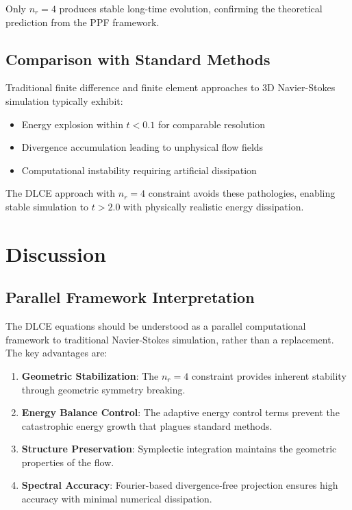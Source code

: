 \documentclass[conference]{IEEEtran}
\begin{document}
Only $n_r = 4$ produces stable long-time evolution, confirming the theoretical prediction from the PPF framework.

\subsection{Comparison with Standard Methods}

Traditional finite difference and finite element approaches to 3D Navier-Stokes simulation typically exhibit:
\begin{itemize}
\item Energy explosion within $t < 0.1$ for comparable resolution
\item Divergence accumulation leading to unphysical flow fields
\item Computational instability requiring artificial dissipation
\end{itemize}

The DLCE approach with $n_r = 4$ constraint avoids these pathologies, enabling stable simulation to $t > 2.0$ with physically realistic energy dissipation.

\section{Discussion}

\subsection{Parallel Framework Interpretation}

The DLCE equations should be understood as a parallel computational framework to traditional Navier-Stokes simulation, rather than a replacement. The key advantages are:

\begin{enumerate}
\item \textbf{Geometric Stabilization}: The $n_r = 4$ constraint provides inherent stability through geometric symmetry breaking.
\item \textbf{Energy Balance Control}: The adaptive energy control terms prevent the catastrophic energy growth that plagues standard methods.
\item \textbf{Structure Preservation}: Symplectic integration maintains the geometric properties of the flow.
\item \textbf{Spectral Accuracy}: Fourier-based divergence-free projection ensures high accuracy with minimal numerical dissipation.
\end{enumerate}
\end{document}
